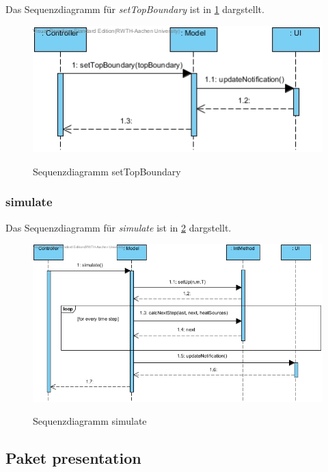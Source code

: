 Das Sequenzdiagramm für \emph{setTopBoundary} ist in \ref{Sequenzdiagramm setTopBoundary} dargstellt.

\begin{figure}[H]
	\centering
	\includegraphics[scale=.6]{Bilder/Model__setTopBoundary().jpg}\\
	\caption{Sequenzdiagramm setTopBoundary}
	\label{Sequenzdiagramm setTopBoundary}
\end{figure}

\subsubsection*{simulate}

Das Sequenzdiagramm für \emph{simulate} ist in \ref{Sequenzdiagramm simulate} dargstellt.

\begin{figure}[H]
	\centering
	\includegraphics[scale=.6]{Bilder/Model__simulate().jpg}\\
	\caption{Sequenzdiagramm simulate}
	\label{Sequenzdiagramm simulate}
\end{figure}

\subsection{Paket presentation}

